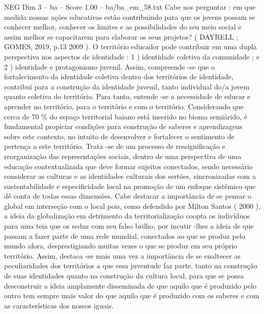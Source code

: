 \begin{textsample}{NEG Dim 3 – ba – Score 1.00 – ba/ba\_em\_58.txt}
Cabe nos perguntar : em que medida nossas ações educativas estão contribuindo para que os jovens possam se conhecer melhor, conhecer os limites e as possibilidades do seu meio social e assim melhor se capacitarem para elaborar os seus projetos? ( DAYRELL ; GOMES, 2019, p.13 2009 ).
O território educador pode contribuir em uma dupla perspectiva nos aspectos de identidade : 1 ) identidade coletiva da comunidade ; e 2 ) identidade e protagonismo juvenil.
Assim, compreende -se que o fortalecimento da identidade coletiva dentro dos territórios de identidade, contribui para a construção da identidade juvenil, tanto individual do/a jovem quanto coletiva do território.
Para tanto, entende -se a necessidade de educar e aprender no território, para o território e com o território.
Considerando que cerca de 70 \% do espaço territorial baiano está inserido no bioma semiárido, é fundamental propiciar condições para construção de saberes e aprendizagens sobre este contexto, no intuito de desenvolver e fortalecer o sentimento de pertença a este território.
Trata -se de um processo de ressignificação e reorganização das representações sociais, dentro de uma perspectiva de uma educação contextualizada que deve formar sujeitos conectados, sendo necessário considerar as culturas e as identidades culturais dos sertões, sincronizadas com a sustentabilidade e especificidade local na promoção de um enfoque sistêmico que dê conta de todas essas dimensões.
Cabe destacar a importância de se pensar o global em interseção com o local pois, como defendido por Milton Santos ( 2000 ), a ideia da globalização em detrimento da territorialização coopta os indivíduos para uma teia que os seduz com seu falso brilho, por incutir -lhes a ideia de que passam a fazer parte de uma rede mundial, conectados ao que se produz pelo mundo afora, desprestigiando muitas vezes o que se produz em seu próprio território.
Assim, destaca -se mais uma vez a importância de se enaltecer as peculiaridades dos territórios a que essa juventude faz parte, tanto na construção de suas identidades quanto na construção da cultura local, para que se possa desconstruir a ideia amplamente disseminada de que aquilo que é produzido pelo outro tem sempre mais valor do que aquilo que é produzido com os saberes e com as características dos nossos iguais.

\end{textsample}
